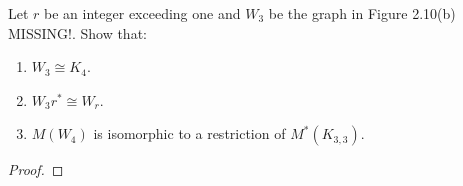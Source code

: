 \prob
{
    Let $r$ be an integer exceeding one and $W_3$ be the graph in Figure 2.10(b) MISSING!. Show that:
    \begin{enumerate}[label=(\roman*)]
        \item $W_3 \cong K_4$.
        \item $W_3r^* \cong W_r$.
        \item $M(W_4)$ is isomorphic to a restriction of $M^*(K_{3,3})$.
    \end{enumerate}
}
\begin{proof}
\end{proof}